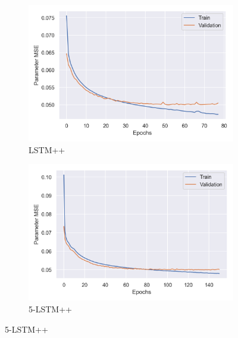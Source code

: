 \begin{figure}[ht]
    \vspace{1cm}
    
    \begin{subfigure}[b]{0.45\textwidth}
        \centering
        \includegraphics[width=\textwidth]{figures/inverse-synth/loss-plots/bilstm-mfcc.png}
        \caption{LSTM++}
    \end{subfigure}
    \begin{subfigure}[b]{0.45\textwidth}
        \centering
        \includegraphics[width=\textwidth]{figures/inverse-synth/loss-plots/bilstm-optuna-mfcc.png}
        \caption{5-LSTM++}
    \end{subfigure}
\end{figure}

